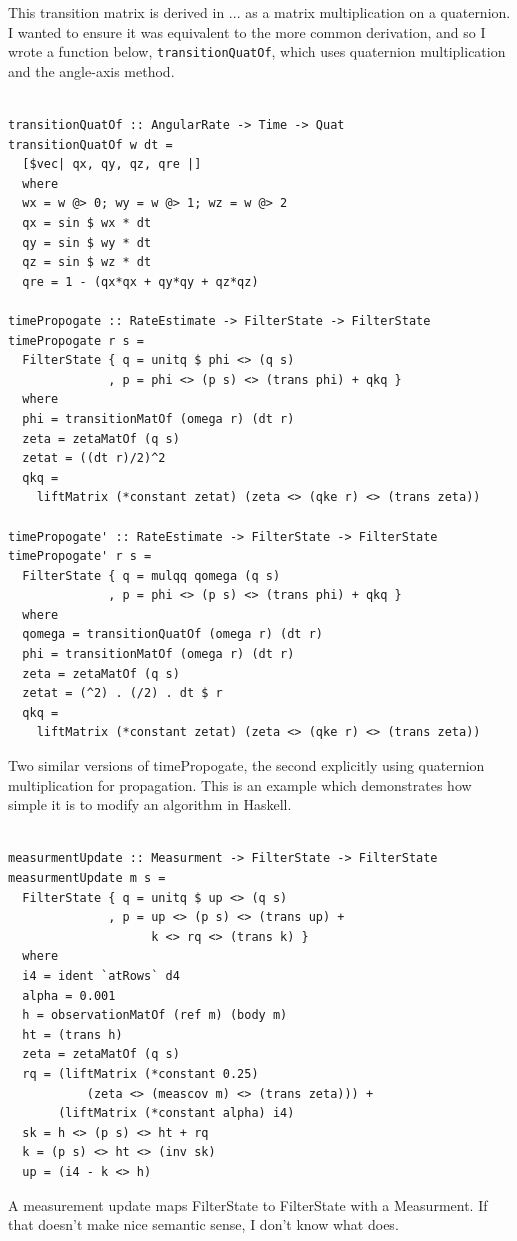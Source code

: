 \documentclass[12pt]{report}
\begin{document}
This transition matrix is derived in ... as a matrix multiplication on a quaternion. I wanted to ensure it was equivalent to the more common derivation, and so I wrote a function below, \lstinline$transitionQuatOf$, which uses quaternion multiplication and the angle-axis method.

\begin{lstlisting}

transitionQuatOf :: AngularRate -> Time -> Quat
transitionQuatOf w dt = 
  [$vec| qx, qy, qz, qre |]
  where
  wx = w @> 0; wy = w @> 1; wz = w @> 2
  qx = sin $ wx * dt
  qy = sin $ wy * dt
  qz = sin $ wz * dt
  qre = 1 - (qx*qx + qy*qy + qz*qz)

timePropogate :: RateEstimate -> FilterState -> FilterState
timePropogate r s = 
  FilterState { q = unitq $ phi <> (q s)
              , p = phi <> (p s) <> (trans phi) + qkq }
  where 
  phi = transitionMatOf (omega r) (dt r)
  zeta = zetaMatOf (q s)
  zetat = ((dt r)/2)^2
  qkq = 
    liftMatrix (*constant zetat) (zeta <> (qke r) <> (trans zeta))

timePropogate' :: RateEstimate -> FilterState -> FilterState
timePropogate' r s = 
  FilterState { q = mulqq qomega (q s)
              , p = phi <> (p s) <> (trans phi) + qkq }
  where 
  qomega = transitionQuatOf (omega r) (dt r)
  phi = transitionMatOf (omega r) (dt r)
  zeta = zetaMatOf (q s)
  zetat = (^2) . (/2) . dt $ r
  qkq = 
    liftMatrix (*constant zetat) (zeta <> (qke r) <> (trans zeta))  

\end{lstlisting}
Two similar versions of timePropogate, the second explicitly using quaternion multiplication for propagation. This is an example which demonstrates how simple it is to modify an algorithm in Haskell.

\begin{lstlisting}

measurmentUpdate :: Measurment -> FilterState -> FilterState
measurmentUpdate m s = 
  FilterState { q = unitq $ up <> (q s)
              , p = up <> (p s) <> (trans up) +
                    k <> rq <> (trans k) }
  where 
  i4 = ident `atRows` d4
  alpha = 0.001
  h = observationMatOf (ref m) (body m)
  ht = (trans h)
  zeta = zetaMatOf (q s)
  rq = (liftMatrix (*constant 0.25) 
           (zeta <> (meascov m) <> (trans zeta))) + 
       (liftMatrix (*constant alpha) i4)
  sk = h <> (p s) <> ht + rq 
  k = (p s) <> ht <> (inv sk)  
  up = (i4 - k <> h)

\end{lstlisting}
A measurement update maps FilterState to FilterState with a Measurment. If that doesn't make nice semantic sense, I don't know what does. 
\end{document}

